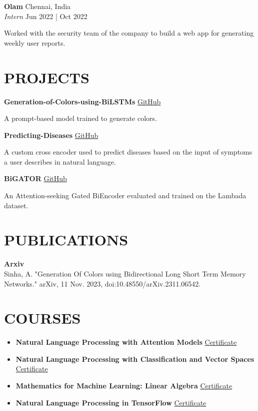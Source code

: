 \documentclass[a4paper,9pt]{extarticle}
\begin{document}
\noindent
\textbf{Olam} \hfill Chennai, India\\ %
\textit{Intern} \hfill Jun 2022 | Oct 2022 %

Worked with the security team of the company to build a web app for generating weekly user reports.

\section*{PROJECTS}
\noindent
\textbf{Generation-of-Colors-using-BiLSTMs} \href{https://github.com/chungimungi/Generation-of-Colors-using-BiLSTMs}{GitHub}

A prompt-based model trained to generate colors.

\noindent
\textbf{Predicting-Diseases} \href{https://github.com/chungimungi/Predicting_Diseases}{GitHub}

A custom cross encoder used to predict diseases based on the input of symptoms a user describes in natural language.

\noindent
\textbf{BiGATOR} \href{https://github.com/chungimungi/BiGATOR}{GitHub}

An Attention-seeking Gated BiEncoder evaluated and trained on the Lambada dataset.

\section*{PUBLICATIONS}
\noindent
\textbf{Arxiv}\\
Sinha, A. "Generation Of Colors using Bidirectional Long Short Term Memory Networks." arXiv, 11 Nov. 2023, doi:10.48550/arXiv.2311.06542.

\section*{COURSES}
\begin{itemize}
    \item \textbf{Natural Language Processing with Attention Models}
    \href{https://www.coursera.org/account/accomplishments/certificate/V3WGDV276MN3}{Certificate}

    \item \textbf{Natural Language Processing with Classification and Vector Spaces}
    \href{https://www.coursera.org/account/accomplishments/certificate/5TYQZQ95QMC2}{Certificate}

    \item \textbf{Mathematics for Machine Learning: Linear Algebra}
    \href{https://www.coursera.org/account/accomplishments/certificate/KPHRWM5J3BZP}{Certificate}

    \item \textbf{Natural Language Processing in TensorFlow}
    \href{https://www.coursera.org/account/accomplishments/verify/XQ3U9NY2BUKA}{Certificate}
\end{itemize}
\end{document}
